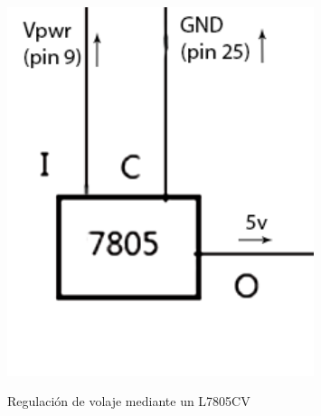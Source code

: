 \documentclass[letterpaper,openright,12pt]{book}
\begin{document}
\begin{figure}
\begin{center}
\includegraphics[width=0.8\textwidth]{figures/lm7805.png}
\caption{Regulación de volaje mediante un L7805CV}
\centering
\label{fig:L7805}
\end{center}
\end{figure} 
\end{document}

